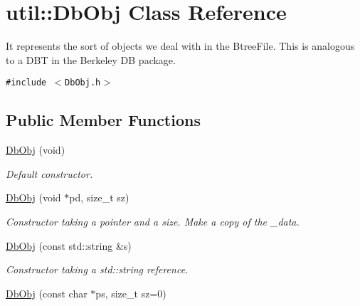 \hypertarget{classutil_1_1DbObj}{
\section{util::DbObj Class Reference}
\label{classutil_1_1DbObj}
}
It represents the sort of objects we deal with in the BtreeFile. This is analogous to a DBT in the Berkeley DB package.  


{\tt \#include $<$DbObj.h$>$}

\subsection*{Public Member Functions}
\begin{CompactItemize}
\item 
\hypertarget{classutil_1_1DbObj_46bd24be85b68ed873f666fbd7ce7c1a}{
\hyperlink{classutil_1_1DbObj_46bd24be85b68ed873f666fbd7ce7c1a}{DbObj} (void)}
\label{classutil_1_1DbObj_46bd24be85b68ed873f666fbd7ce7c1a}

\begin{CompactList}\small\item\em Default constructor. \item\end{CompactList}\item 
\hypertarget{classutil_1_1DbObj_2e027cc833635b3605019a700d89204e}{
\hyperlink{classutil_1_1DbObj_2e027cc833635b3605019a700d89204e}{DbObj} (void $\ast$pd, size\_\-t sz)}
\label{classutil_1_1DbObj_2e027cc833635b3605019a700d89204e}

\begin{CompactList}\small\item\em Constructor taking a pointer and a size. Make a copy of the \_\-data. \item\end{CompactList}\item 
\hypertarget{classutil_1_1DbObj_720ec59f22fb852f5c3ba05eafd929bb}{
\hyperlink{classutil_1_1DbObj_720ec59f22fb852f5c3ba05eafd929bb}{DbObj} (const std::string \&s)}
\label{classutil_1_1DbObj_720ec59f22fb852f5c3ba05eafd929bb}

\begin{CompactList}\small\item\em Constructor taking a std::string reference. \item\end{CompactList}\item 
\hypertarget{classutil_1_1DbObj_040ba9bb33234312d548d872abb0f2d5}{
\hyperlink{classutil_1_1DbObj_040ba9bb33234312d548d872abb0f2d5}{DbObj} (const char $\ast$ps, size\_\-t sz=0)}
\label{classutil_1_1DbObj_040ba9bb33234312d548d872abb0f2d5}


\end{CompactItemize}
